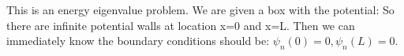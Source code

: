 \documentclass{school-22.101-notes}
\date{September 28, 2011}
\begin{document}
\maketitle



\label{infinite-square-well}
This is an energy eigenvalue problem. We are given a box with the potential:
  So there are infinite potential walls at location x=0 and x=L. Then we can immediately know the boundary conditions should be: $\psi_n (0) = 0, \psi_n(L) = 0$. 
\end{document}
